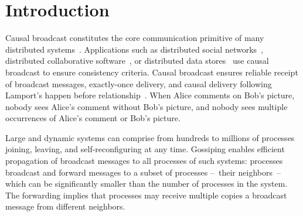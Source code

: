  
\section{Introduction}


Causal broadcast constitutes the core communication primitive of many
distributed systems~\cite{hadzilacos1994modular}. Applications such as
distributed social networks~\cite{borthakur2013petabyte}, distributed
collaborative software~\cite{heinrich2012exploiting,nedelec2016crate}, or
distributed data
stores~\cite{bailis2013bolton,bravo2017saturn,demers1987epidemic,lloyd2011cops,shapiro2011comprehensive}
use causal broadcast to ensure consistency criteria.  Causal broadcast ensures
reliable receipt of broadcast messages, exactly-once delivery, and causal
delivery following Lamport's happen before
relationship~\cite{lamport1978time}. When Alice comments on Bob's picture,
nobody sees Alice's comment without Bob's picture, and nobody sees multiple
occurrences of Alice's comment or Bob's picture.

Large and dynamic systems can comprise from hundreds to millions of processes
joining, leaving, and self-reconfiguring at any time. Gossiping enables
efficient propagation of broadcast messages to all processes of such systems:
processes broadcast and forward messages to a subset of processes --~their
neighbors~-- which can be significantly smaller than the number of processes in
the system. The forwarding implies that processes may receive multiple copies a
broadcast message from different neighbors.

